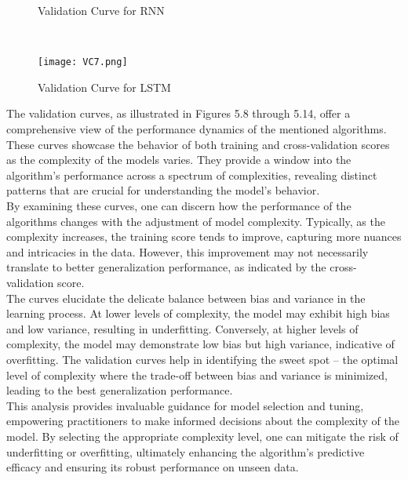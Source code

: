 \documentclass[12pt, English]{article}
\newcommand\tab[1][1cm]{\hspace*{#1}}
\begin{document}
\begin{normalsize}
\begin{figure}
\begin{center}
\end{center}
\begin{center}
\renewcommand{\thefigure}{5.13}
\caption{\footnotesize Validation Curve for RNN }
\end{center}
\\
\begin{center}
\texttt{[image: VC7.png]}
\end{center}
\begin{center}
\renewcommand{\thefigure}{5.14}
\caption{\footnotesize Validation Curve for LSTM }
\end{center}
\end{figure}
\newpage
\tab
The validation curves, as illustrated in Figures 5.8 through 5.14, offer a comprehensive view of the performance dynamics of the mentioned algorithms. These curves showcase the behavior of both training and cross-validation scores as the complexity of the models varies. They provide a window into the algorithm's performance across a spectrum of complexities, revealing distinct patterns that are crucial for understanding the model's behavior.\\
\tab By examining these curves, one can discern how the performance of the algorithms changes with the adjustment of model complexity. Typically, as the complexity increases, the training score tends to improve, capturing more nuances and intricacies in the data. However, this improvement may not necessarily translate to better generalization performance, as indicated by the cross-validation score.\\
\tab The curves elucidate the delicate balance between bias and variance in the learning process. At lower levels of complexity, the model may exhibit high bias and low variance, resulting in underfitting. Conversely, at higher levels of complexity, the model may demonstrate low bias but high variance, indicative of overfitting. The validation curves help in identifying the sweet spot – the optimal level of complexity where the trade-off between bias and variance is minimized, leading to the best generalization performance.\\
\tab This analysis provides invaluable guidance for model selection and tuning, empowering practitioners to make informed decisions about the complexity of the model. By selecting the appropriate complexity level, one can mitigate the risk of underfitting or overfitting, ultimately enhancing the algorithm's predictive efficacy and ensuring its robust performance on unseen data.\\


\end{normalsize}
\end{document}

